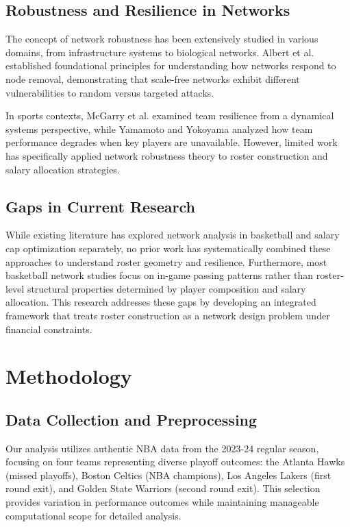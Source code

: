 \documentclass[11pt]{article}
\begin{document}
\subsection{Robustness and Resilience in Networks}

The concept of network robustness has been extensively studied in various domains, from infrastructure systems to biological networks. Albert et al. \cite{albert2000error} established foundational principles for understanding how networks respond to node removal, demonstrating that scale-free networks exhibit different vulnerabilities to random versus targeted attacks.

In sports contexts, McGarry et al. \cite{mcgarry2002sport} examined team resilience from a dynamical systems perspective, while Yamamoto and Yokoyama \cite{yamamoto2011common} analyzed how team performance degrades when key players are unavailable. However, limited work has specifically applied network robustness theory to roster construction and salary allocation strategies.

\subsection{Gaps in Current Research}

While existing literature has explored network analysis in basketball and salary cap optimization separately, no prior work has systematically combined these approaches to understand roster geometry and resilience. Furthermore, most basketball network studies focus on in-game passing patterns rather than roster-level structural properties determined by player composition and salary allocation. This research addresses these gaps by developing an integrated framework that treats roster construction as a network design problem under financial constraints.

\section{Methodology}

\subsection{Data Collection and Preprocessing}

Our analysis utilizes authentic NBA data from the 2023-24 regular season, focusing on four teams representing diverse playoff outcomes: the Atlanta Hawks (missed playoffs), Boston Celtics (NBA champions), Los Angeles Lakers (first round exit), and Golden State Warriors (second round exit). This selection provides variation in performance outcomes while maintaining manageable computational scope for detailed analysis.
\end{document}
